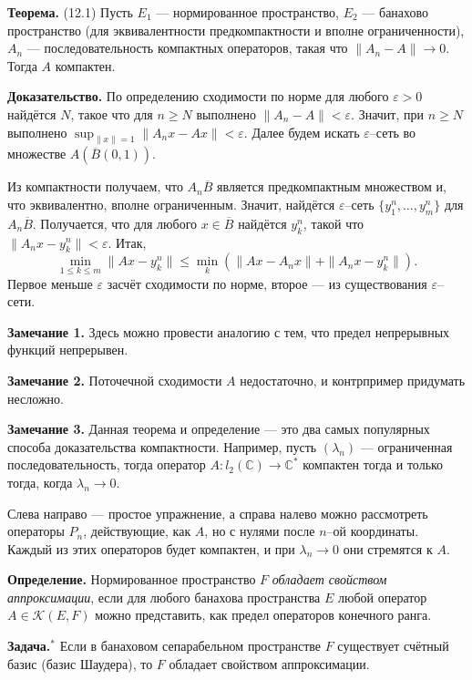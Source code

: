 \label{th:12-1} \textbf{Теорема.} (12.1) Пусть $E_1$ --- нормированное пространство, $E_2$ --- банахово пространство (для эквивалентности предкомпактности и вполне ограниченности), $A_n$ --- последовательность компактных операторов, такая что $\|A_n - A\| \to 0$.
Тогда $A$ компактен.

\textbf{Доказательство.} 
По определению сходимости по норме для любого $\varepsilon > 0$ найдётся $N$, такое что для $n \ge N$ выполнено $\|A_n - A\| < \varepsilon$.
Значит, при $n \ge N$ выполнено $\sup_{\|x\| = 1} \|A_n x - Ax \| < \varepsilon$.
Далее будем искать $\varepsilon$--сеть во множестве $A (\overline B(0, 1))$.

Из компактности получаем, что $A_n \overline B$ является предкомпактным множеством и, что эквивалентно, вполне ограниченным.
Значит, найдётся $\varepsilon$--сеть $\{y_1^n, \dots, y_m^n\}$ для $A_n \overline B$.
Получается, что для любого $x \in \overline B$ найдётся $y_k^n$, такой что $\|A_n x - y_k^n\| < \varepsilon$.
Итак,
\[
    \min_{1 \le k \le m} \|Ax - y_k^n\| \le \min_k \left( \|Ax - A_n x \| + \|A_n x - y_k^n \| \right).
\]
Первое меньше $\varepsilon$ засчёт сходимости по норме, второе --- из существования $\varepsilon$--сети.

\QED

\textbf{Замечание 1.} Здесь можно провести аналогию с тем, что предел непрерывных функций непрерывен.

\textbf{Замечание 2.} Поточечной сходимости $A$ недостаточно, и контрпример придумать несложно.

\textbf{Замечание 3.} Данная теорема и определение --- это два самых популярных способа доказательства компактности.
Например, пусть $(\lambda_n)$ --- ограниченная последовательность, тогда оператор $A: l_2(\mathbb C) \to \mathbb C^*$ компактен тогда и только тогда, когда $\lambda_n \to 0$.

Слева направо --- простое упражнение, а справа налево можно рассмотреть операторы $P_n$, действующие, как $A$, но с нулями после $n$--ой координаты.
Каждый из этих операторов будет компактен, и при $\lambda_n \to 0$ они стремятся к $A$.

\textbf{Определение.} Нормированное пространство $F$ \textit{обладает свойством аппроксимации}, если для любого банахова пространства $E$ любой оператор $A \in \mathcal K(E, F)$ можно представить, как предел операторов конечного ранга.

\textbf{Задача.}$^*$ Если в банаховом сепарабельном пространстве $F$ существует счётный базис (базис Шаудера), то $F$ обладает свойством аппроксимации.

